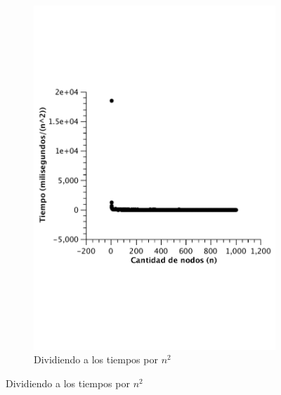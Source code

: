\begin{figure}[H]
        \begin{subfigure}[b]{0.5\textwidth}
                \includegraphics[width=\textwidth]{imagenes/completo-matriz-3.pdf}
                \caption{Dividiendo a los tiempos por $n^2$}
        \end{subfigure}


\end{figure}
